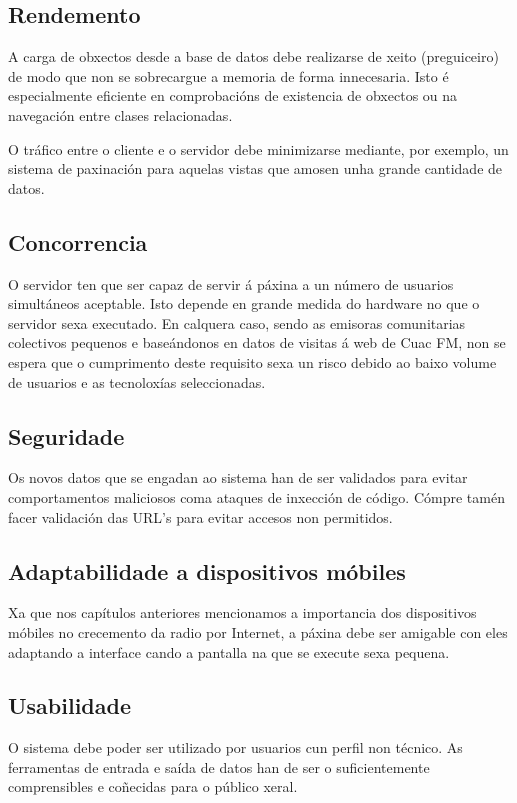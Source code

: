 \subsection{Rendemento}

A carga de obxectos desde a base de datos debe realizarse de xeito  (preguiceiro) de modo que non se sobrecargue a memoria de forma innecesaria. Isto é especialmente eficiente en comprobacións de existencia de obxectos ou na navegación entre clases relacionadas. 

O tráfico entre o cliente e o servidor debe minimizarse mediante, por exemplo, un sistema de paxinación para aquelas vistas que amosen unha grande cantidade de datos.

\subsection{Concorrencia}

O servidor ten que ser capaz de servir á páxina a un número de usuarios simultáneos aceptable. Isto depende en grande medida do hardware no que o servidor sexa executado. En calquera caso, sendo as emisoras comunitarias colectivos pequenos e baseándonos en datos de visitas á web de Cuac FM, non se espera que o cumprimento deste requisito sexa un risco debido ao baixo volume de usuarios e as tecnoloxías seleccionadas.

\subsection{Seguridade}

Os novos datos que se engadan ao sistema han de ser validados para evitar comportamentos maliciosos coma ataques de inxección de código. Cómpre tamén facer validación das URL's para evitar accesos non permitidos. 

\subsection{Adaptabilidade a dispositivos móbiles}

Xa que nos capítulos anteriores mencionamos a importancia dos dispositivos móbiles no crecemento da radio por Internet, a páxina debe ser amigable con eles adaptando a interface cando a pantalla na que se execute sexa pequena.


\subsection{Usabilidade}

O sistema debe poder ser utilizado por usuarios cun perfil non técnico. As ferramentas de entrada e saída de datos han de ser o suficientemente comprensibles e coñecidas para o público xeral.

